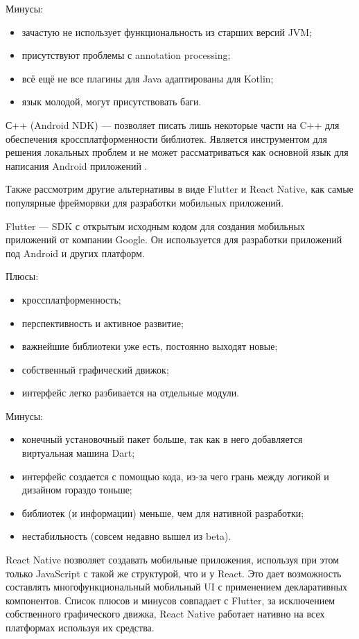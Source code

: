 Минусы:
\begin{itemize}
 \item зачастую не использует функциональность из старших версий JVM;
 \item присутствуют проблемы с annotation processing;
 \item всё ещё не все плагины для Java адаптированы для Kotlin;
 \item язык молодой, могут присутствовать баги.
\end{itemize}

С++ (Android NDK) — позволяет писать лишь некоторые части на C++ для обеспечения кроссплатформенности библиотек. Является инструментом для решения локальных проблем и не может рассматриваться как основной язык для написания Android приложений \cite{web12}.

Также рассмотрим другие альтернативы в виде Flutter и React Native, как самые популярные фрейморвки для разработки мобильных приложений.

Flutter — SDK с открытым исходным кодом для создания мобильных приложений от компании Google. Он используется для разработки приложений под Android и других платформ.

Плюсы:
\begin{itemize}
 \item кроссплатформенность;
 \item перспективность и активное развитие;
 \item важнейшие библиотеки уже есть, постоянно выходят новые;
 \item собственный графический движок;
 \item интерфейс легко разбивается на отдельные модули.
\end{itemize}

Минусы:
\begin{itemize}
 \item конечный установочный пакет больше, так как в него добавляется виртуальная машина Dart;
 \item интерфейс создается с помощью кода, из-за чего грань между логикой и дизайном гораздо тоньше;
 \item библиотек (и информации) меньше, чем для нативной разработки;
 \item нестабильность (совсем недавно вышел из beta).
\end{itemize}


React Native позволяет создавать мобильные приложения, используя при этом только JavaScript с такой же структурой, что и у React. Это дает возможность составлять многофункциональный мобильный UI с применением декларативных компонентов. Список плюсов и минусов совпадает с Flutter, за исключением собственного графического движка, React Native работает нативно на всех платформах используя их средства.


